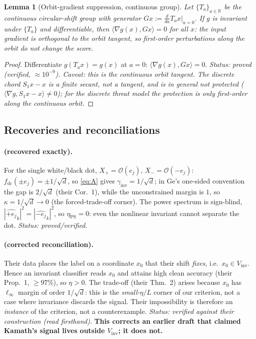 \documentclass[11pt]{article}
\theoremstyle{plain}
\newtheorem{lemma}{Lemma}
\theoremstyle{definition}
\theoremstyle{remark}
\newcommand{\R}{\mathbb{R}}
\newcommand{\fdc}{f_{\mathrm{dc}}}
\newcommand{\Vinv}{V_{\mathrm{inv}}}
\newcommand{\inv}{\mathrm{inv}}
\begin{document}
\begin{lemma}[Orbit-gradient suppression, continuous group]\label{lem:orbitgrad}
Let $\{T_a\}_{a\in\R}$ be the continuous circular-shift group with generator $Gx:=\tfrac{d}{da}T_ax\big|_{a=0}$. If $g$ is invariant under $\{T_a\}$ and differentiable, then $\langle\nabla g(x),Gx\rangle=0$ for all $x$: the input gradient is orthogonal to the orbit tangent, so first-order perturbations along the orbit do not change the score.
\end{lemma}
\begin{proof}
Differentiate $g(T_ax)=g(x)$ at $a=0$: $\langle\nabla g(x),Gx\rangle=0$. \emph{Status: proved (verified, $\approx10^{-9}$). Caveat: this is the \emph{continuous} orbit tangent. The \emph{discrete} chord $S_1x-x$ is a finite secant, not a tangent, and is in general not protected ($\langle\nabla g,S_1x-x\rangle\neq0$); for the discrete threat model the protection is only first-order along the continuous orbit.}
\end{proof}

\subsection{Recoveries and reconciliations}\label{sec:recover}
\paragraph{\citet{ge2021shift} (recovered exactly).} For the single white/black dot, $X_+=\mathcal O(e_j)$, $X_-=\mathcal O(-e_j)$: $\fdc(\pm e_j)=\pm1/\sqrt d$, so \eqref{eq:A} gives $\gamma_\inv=1/\sqrt d$; in Ge's one-sided convention the gap is $2/\sqrt d$ (their Cor.~1), while the unconstrained margin is $1$, so $\kappa=1/\sqrt d\to0$ (the forced-trade-off corner). The power spectrum is sign-blind, $|\widehat{+e_j}_k|^2=|\widehat{-e_j}_k|^2$, so $\eta_{\mathrm{PS}}=0$: even the nonlinear invariant cannot separate the dot. \emph{Status: proved/verified.}

\paragraph{\citet{kamath2021canwehaveitall} (corrected reconciliation).} Their data places the label on a coordinate $x_0$ that their shift \emph{fixes}, i.e.\ $x_0\in\Vinv$. Hence an invariant classifier reads $x_0$ and attains high clean accuracy (their Prop.~1, $\ge97\%$), so $\eta>0$. The trade-off (their Thm.~2) arises because $x_0$ has $\ell_\infty$ margin of order $1/\sqrt d$: this is the \emph{small-}$\eta/L$ corner of our criterion, not a case where invariance discards the signal. Their impossibility is therefore an \emph{instance} of the criterion, not a counterexample. \emph{Status: verified against their construction (read firsthand).} \textbf{This corrects an earlier draft that claimed Kamath's signal lives outside $\Vinv$; it does not.}
\end{document}
